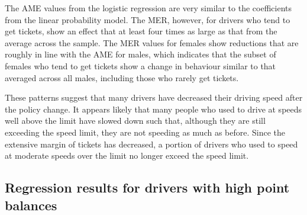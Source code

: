\documentclass{cje}
\begin{document}
The AME values from the logistic regression are very similar to
the coefficients from the linear probability model. 
The MER, however, for drivers who tend to get tickets, 
show an effect that at least four times as large 
as that from the average across the sample. 
The MER values for females show reductions 
that are roughly in line with the AME for males, 
which indicates that the subset of females who tend to get tickets
show a change in behaviour similar to that 
averaged across all males, including those who rarely get tickets. 


These patterns suggest that many drivers have decreased their driving speed 
after the policy change. 
It appears likely that many people who used to drive at speeds well above the limit 
have slowed down such that, although they are still exceeding the speed limit, 
they are not speeding as much as before. 
Since the extensive margin of tickets has decreased, a portion of drivers who used to speed at moderate speeds over the limit 
no longer exceed the speed limit.

\subsection{Regression results for drivers with high point balances}
\label{sec:Empirical_high_pts}
\end{document}

